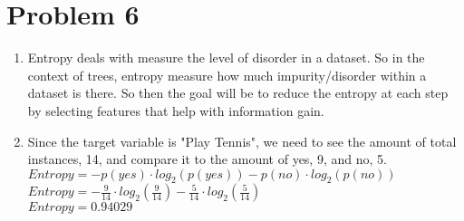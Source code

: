 \documentclass{article}
\begin{document}
\section*{Problem 6}
\begin{enumerate}[label=(\alph*)]
    \item Entropy deals with measure the level of disorder in a dataset. So in the context of trees, entropy measure how much impurity/disorder within a dataset is there. 
    So then the goal will be to reduce the entropy at each step by selecting features that help with information gain. 
    \item Since the target variable is "Play Tennis", we need to see the amount of total instances, 14, and compare it to the amount of yes, 9, and no, 5.
    \\$Entropy = -p(yes) \cdot log_2(p(yes)) - p(no) \cdot log_2(p(no))$
    \\$Entropy = -\frac{9}{14} \cdot log_2(\frac{9}{14}) - \frac{5}{14} \cdot log_2(\frac{5}{14})$
    \\$Entropy = 0.94029$

\end{enumerate}
\end{document}
